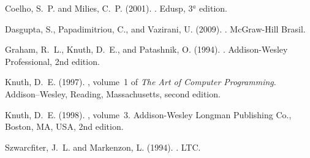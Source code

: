 \documentclass{article}
\begin{document}
\begin{thebibliography}{}

Coelho, S.~P. and Milies, C.~P. (2001).
.
\newblock Edusp, 3$^a$ edition.

Dasgupta, S., Papadimitriou, C., and Vazirani, U. (2009).
.
\newblock McGraw-Hill Brasil.

Graham, R.~L., Knuth, D.~E., and Patashnik, O. (1994).
.
\newblock Addison-Wesley Professional, 2nd edition.

Knuth, D.~E. (1997).
, volume~1 of {\em The Art of Computer
  Programming}.
\newblock Addison--Wesley, Reading, Massachusetts, second edition.

Knuth, D.~E. (1998).
, volume~3.
\newblock Addison-Wesley Longman Publishing Co., Boston, MA, USA, 2nd edition.

Szwarcfiter, J.~L. and Markenzon, L. (1994).
.
\newblock LTC.

\end{thebibliography}
\end{document}
